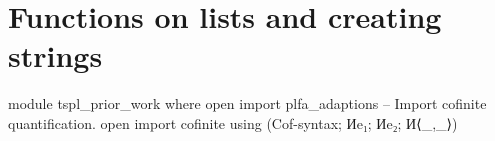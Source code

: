 \section{Functions on lists and creating strings}
\label{appendix:list_functions}
\begin{code}
module tspl_prior_work where
  open import plfa_adaptions
  -- Import cofinite quantification.
  open import cofinite using (Cof-syntax; Иe₁; Иe₂; И⟨_,_⟩) 
\end{code}
\begin{comment}
  \begin{code}
  -- Data types (naturals, strings, characters)
  open import Data.Nat using (ℕ; zero; suc; _<_; _≥_; _≤_; _≤?_; _<?_; z≤n; s≤s; _⊔_)
    renaming (_≟_ to _≟ℕ_)
  open import Data.Nat.Properties using (≤-refl; ≤-trans; ≤-<-trans; <-≤-trans; ≤-antisym; ≤-total;
    +-mono-≤; n≤1+n; m≤n⇒m≤1+n; suc-injective; <⇒≢; ≰⇒>; ≮⇒≥)
  open import Data.String using (String; fromList) renaming (_≟_ to _≟str_; _++_ to _++str_;
    length to str-length; toList to ⟪_⟫)
  open import Data.Char using (Char)
  open import Data.Char.Properties using () renaming (_≟_ to _≟char_)
  
  -- Function manipulation.
  open import Function using (_∘_; flip; it; id; case_returning_of_)
  
  -- Relations and predicates/decidability.
  import Relation.Binary.PropositionalEquality as Eq
  open Eq using (_≡_; _≢_; refl; sym; trans; cong; cong-app; cong₂)
  open Eq.≡-Reasoning using (begin_; step-≡-∣; step-≡-⟩; _∎)
  open import Relation.Binary.Definitions using (DecidableEquality)
  open import Relation.Nullary.Decidable using (Dec; yes; no; True; False; toWitnessFalse;
    toWitness; fromWitness; ¬?; ⌊_⌋; From-yes)
  open import Relation.Unary using (Decidable)
  open import Relation.Binary using () renaming (Decidable to BinaryDecidable)
  open import Relation.Nullary.Negation using (¬_; contradiction)
  open import Data.Empty using (⊥-elim)
  
  -- Products and exists quantifier.
  open import Data.Product using (_×_; proj₁; proj₂; ∃-syntax) renaming (_,_ to ⟨_,_⟩)
  
  -- Lists.
  open import Data.List using (List; []; _∷_; _++_; length; filter; map; foldr; head; replicate)
  open import Data.List.Properties using (≡-dec)
  import Data.List.Membership.DecPropositional as DecPropMembership
  open import Data.List.Relation.Unary.All using (All; all?; lookup)
    renaming (fromList to All-fromList; toList to All-toList)
  open import Data.List.Relation.Unary.Any using (Any; here; there)
  open import Data.List.Extrema Data.Nat.Properties.≤-totalOrder using (max; xs≤max)
  

\end{comment}
